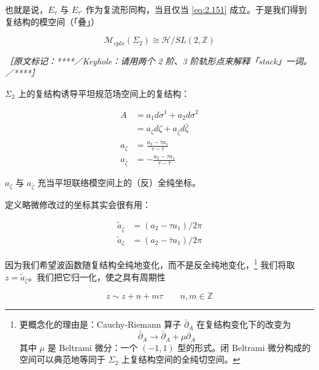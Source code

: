 也就是说，$E_\tau$ 与 $E_{\tau'}$ 作为复流形同构，当且仅当 \eqref{eq:2.151} 成立。于是我们得到复结构的模空间（「叠」）

\begin{equation}
  \mathcal{M}_{cplx}(\Sigma_2)\cong\mathcal{H}/SL(2,\mathbb{Z})
  \tag{2.152}
  \label{eq:2.152}
\end{equation}

{\small\itshape ［原文标记：****／Keyhole：请用两个 2 阶、3 阶轨形点来解释「stack」一词。／****］}

$\Sigma_2$ 上的复结构诱导平坦规范场空间上的复结构：

\begin{equation}
  \begin{aligned}
    A&=a_1d\sigma^1+a_2d\sigma^2\\
    &=a_\zeta d\zeta+a_{\bar\zeta}d\bar\zeta\\
    a_\zeta&=\frac{a_2-\bar\tau a_1}{\tau-\bar\tau}\\
    a_{\bar\zeta}&=-\frac{a_2-\tau a_1}{\tau-\bar\tau}
  \end{aligned}
  \tag{2.153}
  \label{eq:2.153}
\end{equation}

$a_\zeta$ 与 $a_{\bar\zeta}$ 充当平坦联络模空间上的（反）全纯坐标。

定义略微修改过的坐标其实会很有用：

\begin{equation}
  \begin{aligned}
    \tilde a_{\bar\zeta}&=(a_2-\tau a_1)/2\pi\\
    \tilde a_\zeta&=(a_2-\bar\tau a_1)/2\pi
  \end{aligned}
  \tag{2.154}
  \label{eq:2.154}
\end{equation}

因为我们希望波函数随复结构全纯地变化，而不是反全纯地变化，\footnote{更概念化的理由是：Cauchy-Riemann 算子 $\bar\partial_A$ 在复结构变化下的改变为
\begin{equation}
  \bar\partial_A\to\bar\partial_A+\mu\partial_A
  \tag{2.155}
  \label{eq:2.155}
\end{equation}
其中 $\mu$ 是 Beltrami 微分：一个 $(-1,1)$ 型的形式。闭 Beltrami 微分构成的空间可以典范地等同于 $\Sigma_2$ 上复结构空间的全纯切空间。} 我们将取 $z=\tilde a_{\bar\zeta}$。我们把它归一化，使之具有周期性

\begin{equation}
  z\sim z+n+m\tau \qquad n,m\in\mathbb{Z}
  \tag{2.156}
  \label{eq:2.156}
\end{equation}

